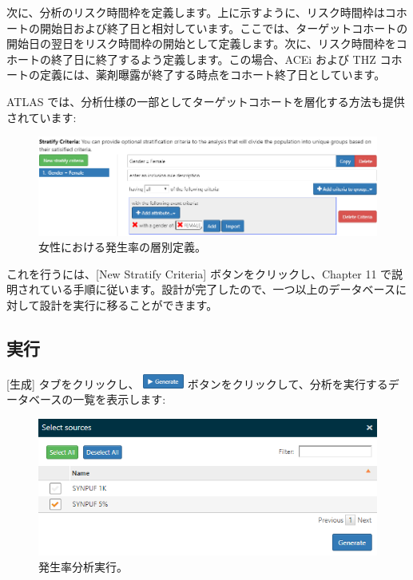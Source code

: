 \documentclass[
  11pt]{book}
\theoremstyle{definition}
\theoremstyle{definition}
\theoremstyle{definition}
\theoremstyle{definition}
\theoremstyle{remark}
\begin{document}
次に、分析のリスク時間枠を定義します。上に示すように、リスク時間枠はコホートの開始日および終了日と相対しています。ここでは、ターゲットコホートの開始日の翌日をリスク時間枠の開始として定義します。次に、リスク時間枠をコホートの終了日に終了するよう定義します。この場合、ACEi および THZ コホートの定義には、薬剤曝露が終了する時点をコホート終了日としています。

ATLAS では、分析仕様の一部としてターゲットコホートを層化する方法も提供されています:

\begin{figure}

{\centering \includegraphics[width=1\linewidth]{images/Characterization/atlasIncidenceStratifyFemale} 

}

\caption{女性における発生率の層別定義。}\label{fig:atlasIncidenceStratifyFemale}
\end{figure}

これを行うには、{[}New Stratify Criteria{]} ボタンをクリックし、Chapter 11 で説明されている手順に従います。設計が完了したので、一つ以上のデータベースに対して設計を実行に移ることができます。

\subsection{実行}\label{ux5b9fux884c-2}

{[}生成{]} タブをクリックし、 \includegraphics{images/Characterization/atlasIncidenceGenerate.png} ボタンをクリックして、分析を実行するデータベースの一覧を表示します:

\begin{figure}

{\centering \includegraphics[width=1\linewidth]{images/Characterization/atlasIncidenceSourceSelection} 

}

\caption{発生率分析実行。}\label{fig:atlasIncidenceSourceSelection}
\end{figure}
\end{document}
